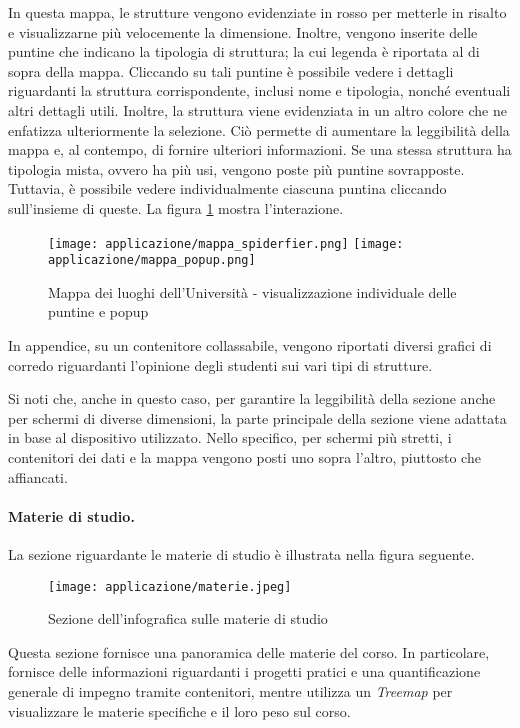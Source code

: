 In questa mappa, le strutture vengono evidenziate in rosso per metterle in risalto e visualizzarne più velocemente la dimensione.
Inoltre, vengono inserite delle puntine che indicano la tipologia di struttura; la cui legenda è riportata al di sopra della mappa.
Cliccando su tali puntine è possibile vedere i dettagli riguardanti la struttura corrispondente, inclusi nome e tipologia, nonché eventuali altri dettagli utili. 
Inoltre, la struttura viene evidenziata in un altro colore che ne enfatizza ulteriormente la selezione.
Ciò permette di aumentare la leggibilità della mappa e, al contempo, di fornire ulteriori informazioni.
Se una stessa struttura ha tipologia mista, ovvero ha più usi, vengono poste più puntine sovrapposte. Tuttavia, è possibile vedere individualmente ciascuna puntina 
cliccando sull'insieme di queste.
La figura \ref{fig:app_mappa_interazione} mostra l'interazione.
\begin{figure}[H] 
    \centering 
    \texttt{[image: applicazione/mappa\_spiderfier.png]} 
    \texttt{[image: applicazione/mappa\_popup.png]} 
    \caption{Mappa dei luoghi dell'Università - visualizzazione individuale delle puntine e popup}
    \label{fig:app_mappa_interazione}
\end{figure}

In appendice, su un contenitore collassabile, vengono riportati diversi grafici di corredo riguardanti l'opinione degli studenti sui vari tipi di strutture.

\bigskip
\noindent Si noti che, anche in questo caso, per garantire la leggibilità della sezione anche per schermi di diverse dimensioni, la parte principale della sezione viene adattata 
in base al dispositivo utilizzato. Nello specifico, per schermi più stretti, i contenitori dei dati e la mappa vengono posti uno sopra l'altro, piuttosto che affiancati.

\paragraph{Materie di studio.} La sezione riguardante le materie di studio è illustrata nella figura seguente. 
\begin{figure}[H] 
    \centering 
    \texttt{[image: applicazione/materie.jpeg]} 
    \caption{Sezione dell'infografica sulle materie di studio}
    \label{fig:app_materie}
\end{figure}
\noindent Questa sezione fornisce una panoramica delle materie del corso. In particolare, fornisce delle informazioni riguardanti i progetti pratici e una quantificazione generale di impegno 
tramite contenitori, mentre utilizza un \emph{Treemap} per visualizzare le materie specifiche e il loro peso sul corso.

